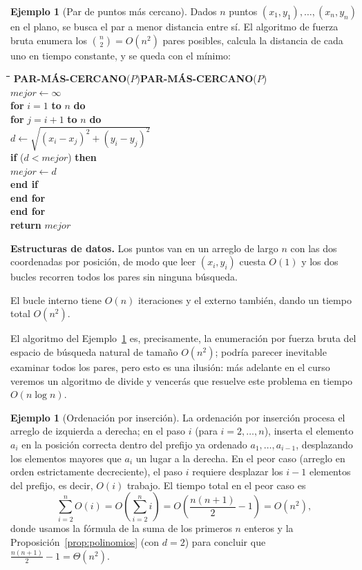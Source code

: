 \documentclass[12pt, spanish, oneside, openany]{book}
\newcommand{\pl}[1]{\makebox[1.6em][r]{\texttt{\footnotesize #1}}\hspace{0.9em}}
\newenvironment{pseudo}[1]{%
  \begin{center}%
  \begin{mdframed}[style=pseudobox]%
  \small
  \begin{tabbing}%
  \hspace{2.5em}\=\hspace{1.5em}\=\hspace{1.5em}\=\hspace{1.5em}\=\hspace{1.5em}\=\kill
  \def\pseudotitulo{#1}\ifx\pseudotitulo\empty\else#1\\[3pt]\fi}%
  {\end{tabbing}\end{mdframed}\end{center}}
\newenvironment{estructuras}%
  {\begin{center}\begin{minipage}{0.93\textwidth}\begin{mdframed}[style=estrbox]%
   \small\textbf{Estructuras de datos.}\;}%
  {\end{mdframed}\end{minipage}\end{center}}
\theoremstyle{uprightplain}
\theoremstyle{definition}
\newtheorem{ejemplo}[teorema]{Ejemplo}
\theoremstyle{remark}
\theoremstyle{definition}
\begin{document}
\begin{ejemplo}[Par de puntos más cercano]
\label{ej:par-cercano}
Dados $n$ puntos $(x_1,y_1),\dots,(x_n,y_n)$ en el plano, se busca el par a menor distancia entre sí. El algoritmo de fuerza bruta enumera los $\binom{n}{2}=O(n^2)$ pares posibles, calcula la distancia de cada uno en tiempo constante, y se queda con el mínimo:
\begin{pseudo}{\textbf{PAR-MÁS-CERCANO}($P$)}
\pl{1}\> $\mathit{mejor} \leftarrow \infty$\\
\pl{2}\> \textbf{for} $i=1$ \textbf{to} $n$ \textbf{do}\\
\pl{3}\>\> \textbf{for} $j=i+1$ \textbf{to} $n$ \textbf{do}\\
\pl{4}\>\>\> $d \leftarrow \sqrt{(x_i-x_j)^2+(y_i-y_j)^2}$\\
\pl{5}\>\>\> \textbf{if} ($d < \mathit{mejor}$) \textbf{then}\\
\pl{6}\>\>\>\> $\mathit{mejor} \leftarrow d$\\
\pl{7}\>\>\> \textbf{end if}\\
\pl{8}\>\> \textbf{end for}\\
\pl{9}\> \textbf{end for}\\
\pl{10}\> \textbf{return} $\mathit{mejor}$
\end{pseudo}

\begin{estructuras}
Los puntos van en un arreglo de largo $n$ con las dos coordenadas por posición,
de modo que leer $(x_i,y_i)$ cuesta $O(1)$ y los dos bucles recorren todos los
pares sin ninguna búsqueda.
\end{estructuras}
El bucle interno tiene $O(n)$ iteraciones y el externo también, dando un tiempo total $O(n^2)$.
\end{ejemplo}

El algoritmo del Ejemplo~\ref{ej:par-cercano} es, precisamente, la enumeración por fuerza bruta del espacio de búsqueda natural de tamaño $O(n^2)$; podría parecer inevitable examinar todos los pares, pero esto es una ilusión: más adelante en el curso veremos un algoritmo de divide y vencerás que resuelve este problema en tiempo $O(n\log n)$.

\begin{ejemplo}[Ordenación por inserción]
\label{ej:insercion-cuadratica}
La ordenación por inserción procesa el arreglo de izquierda a derecha; en el paso $i$ (para $i=2,\dots,n$), inserta el elemento $a_i$ en la posición correcta dentro del prefijo ya ordenado $a_1,\dots,a_{i-1}$, desplazando los elementos mayores que $a_i$ un lugar a la derecha. En el peor caso (arreglo en orden estrictamente decreciente), el paso $i$ requiere desplazar los $i-1$ elementos del prefijo, es decir, $O(i)$ trabajo. El tiempo total en el peor caso es
\[
\sum_{i=2}^{n} O(i) = O\!\left(\sum_{i=2}^n i\right) = O\!\left(\frac{n(n+1)}{2}-1\right) = O(n^2),
\]
donde usamos la fórmula de la suma de los primeros $n$ enteros y la Proposición~\ref{prop:polinomios} (con $d=2$) para concluir que $\tfrac{n(n+1)}{2}-1=\Theta(n^2)$.
\end{ejemplo}
\end{document}
